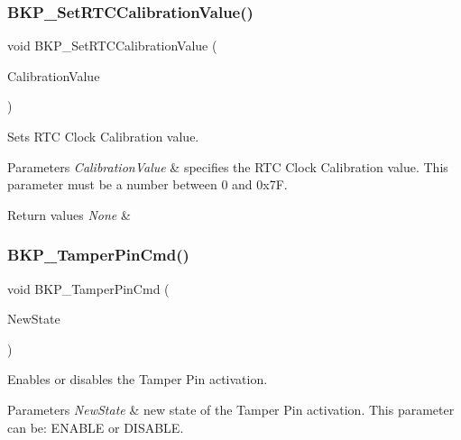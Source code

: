 \subsubsection{\texorpdfstring{BKP\_SetRTCCalibrationValue()}{BKP\_SetRTCCalibrationValue()}}
{\footnotesize\ttfamily void B\+K\+P\+\_\+\+Set\+R\+T\+C\+Calibration\+Value (\begin{DoxyParamCaption}\item[{uint8\+\_\+t}]{Calibration\+Value }\end{DoxyParamCaption})}



Sets R\+TC Clock Calibration value. 


\begin{DoxyParams}{Parameters}
{\em Calibration\+Value} & specifies the R\+TC Clock Calibration value. This parameter must be a number between 0 and 0x7F. \\
\hline
\end{DoxyParams}

\begin{DoxyRetVals}{Return values}
{\em None} & \\
\hline
\end{DoxyRetVals}
\mbox{\label{group___b_k_p___private___functions_ga3a0cdff9ad8238ade2c67e2b70f530ac}} 
\subsubsection{\texorpdfstring{BKP\_TamperPinCmd()}{BKP\_TamperPinCmd()}}
{\footnotesize\ttfamily void B\+K\+P\+\_\+\+Tamper\+Pin\+Cmd (\begin{DoxyParamCaption}\item[{\mbox{\hyperlink{group___exported__types_gac9a7e9a35d2513ec15c3b537aaa4fba1}{Functional\+State}}}]{New\+State }\end{DoxyParamCaption})}



Enables or disables the Tamper Pin activation. 


\begin{DoxyParams}{Parameters}
{\em New\+State} & new state of the Tamper Pin activation. This parameter can be\+: E\+N\+A\+B\+LE or D\+I\+S\+A\+B\+LE. \\
\hline
\end{DoxyParams}

